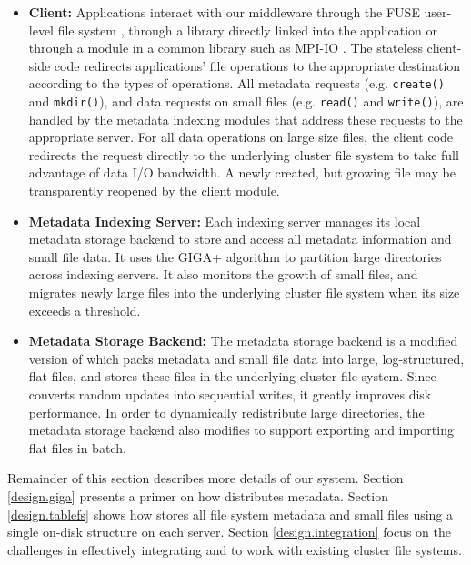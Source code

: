 \begin{itemize}
\item{\textbf{Client:}} Applications interact with our middleware
through the FUSE user-level file system \cite{fuse},
through a library directly linked into the application
or through a module in a common library such as MPI-IO \cite{mpi}.
The stateless client-side code redirects applications' file operations
to the appropriate destination according to the types of operations.
All metadata requests (e.g. \texttt{create()} and \texttt{mkdir()}),
and data requests on small files (e.g. \texttt{read()} and \texttt{write()}),
are handled by the metadata indexing modules that address
these requests to the appropriate server.
For all data operations on large size files, the client code redirects
the request directly to the underlying cluster file system to take full
advantage of data I/O bandwidth. A newly created, but growing file
may be transparently reopened by the client module.

\item{\textbf{Metadata Indexing Server:}}
Each indexing server manages its local metadata storage backend to store and
access all metadata information and small file data.
It uses the GIGA+ algorithm to
partition large directories across indexing servers. It also monitors the growth
of small files, and migrates newly large files into
the underlying cluster file system
when its size exceeds a threshold.

\item{\textbf{Metadata Storage Backend:}}
The metadata storage backend is a modified version of \tfs which packs metadata
and small file data into large, log-structured, flat files,
and stores these files
in the underlying cluster file system. Since \tfs converts random updates into
sequential writes, it greatly improves disk performance. In order to
dynamically redistribute large directories,
the metadata storage backend also modifies
\tfs to support exporting and importing flat files in batch.

\end{itemize}

Remainder of this section describes more details of our system.
Section \ref{design.giga} presents a primer on how \giga distributes metadata.
Section \ref{design.tablefs} shows how \tfs stores all file system metadata
and small files using a single on-disk structure on each server.
Section \ref{design.integration} focus on the challenges in effectively
integrating \giga and \tfs to work with existing cluster file systems.


